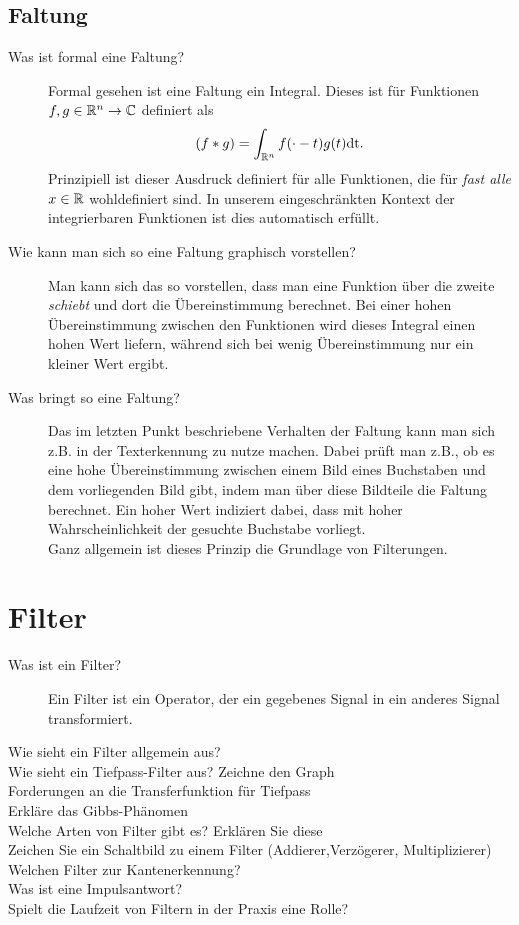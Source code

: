 \subsection{Faltung}
\begin{description}
  \item[Was ist formal eine Faltung?]
    Formal gesehen ist eine Faltung ein Integral. Dieses ist für Funktionen $f, g\in\mathbb{R}^n \to \mathbb{C}$ definiert als
    $$ (f*g) = \int_{\mathbb{R}^n} f(\cdot - t)g(t)\text{dt}. $$
    Prinzipiell ist dieser Ausdruck definiert für alle Funktionen, die für \emph{fast alle} $x\in\mathbb{R}$ wohldefiniert
    sind. In unserem eingeschränkten Kontext der integrierbaren  Funktionen ist dies automatisch erfüllt.
  \item[Wie kann man sich so eine Faltung graphisch vorstellen?]
    Man kann sich das so vorstellen, dass man eine Funktion über die zweite \emph{schiebt} und dort die 
    Übereinstimmung berechnet. Bei einer hohen Übereinstimmung zwischen den Funktionen wird dieses Integral einen
    hohen Wert liefern, während sich bei wenig Übereinstimmung nur ein kleiner Wert ergibt.
  \item[Was bringt so eine Faltung?]
    Das im letzten Punkt beschriebene Verhalten der Faltung kann man sich z.B. in der Texterkennung zu nutze machen.
    Dabei prüft man z.B., ob es eine hohe Übereinstimmung zwischen einem Bild eines Buchstaben und dem vorliegenden
    Bild gibt, indem man über diese Bildteile die Faltung berechnet. Ein hoher Wert indiziert dabei, dass mit hoher
    Wahrscheinlichkeit der gesuchte Buchstabe vorliegt.\\
    Ganz allgemein ist dieses Prinzip die Grundlage von Filterungen.
\end{description}

\section{Filter}
\begin{description}
	\item[Was ist ein Filter?]
      Ein Filter ist ein Operator, der ein gegebenes Signal in ein anderes Signal transformiert.
	\item[Wie sieht ein Filter allgemein aus?]
	\item[Wie sieht ein Tiefpass-Filter aus? Zeichne den Graph]
	\item[Forderungen an die Transferfunktion für Tiefpass]
	\item[Erkläre das Gibbs-Phänomen]
	\item[Welche Arten von Filter gibt es? Erklären Sie diese]
	\item[Zeichen Sie ein Schaltbild zu einem Filter (Addierer,Verzögerer, Multiplizierer)]
	\item[Welchen Filter zur Kantenerkennung?]
	\item[Was ist eine Impulsantwort?]
	\item[Spielt die Laufzeit von Filtern in der Praxis eine Rolle?]
\end{description}
